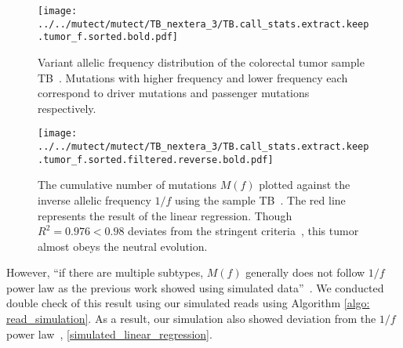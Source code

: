 \documentclass{article}
\begin{document}
\begin{figure}[H]
 \begin{minipage}[c]{0.47\hsize}
 \begin{center}
  \texttt{[image: ../../mutect/mutect/TB\_nextera\_3/TB.call\_stats.extract.keep.tumor\_f.sorted.bold.pdf]}
 \end{center}
    \caption{
  Variant allelic frequency distribution of the colorectal tumor sample TB~\cite{williams2016identification}.
  Mutations with higher frequency and lower frequency each correspond to driver mutations and passenger mutations respectively.
  }\label{TB_vaf}
\end{minipage}
 \hspace{1truecm}
\begin{minipage}[c]{0.47\hsize}
 \begin{center}
 \texttt{[image: ../../mutect/mutect/TB\_nextera\_3/TB.call\_stats.extract.keep.tumor\_f.sorted.filtered.reverse.bold.pdf]}
 \end{center}
   \caption{
  The cumulative number of mutations $M(f)$ plotted against the inverse allelic frequency $1/f$
  using the sample TB~\cite{williams2016identification}.
  The red line represents the result of the linear regression.
 Though $R^2 = 0.976 < 0.98$ deviates from the stringent criteria~\cite{williams2016identification}, this tumor almost obeys the neutral evolution.
  }
 \label{TB_linear_regression}
\end{minipage}
\end{figure}

However, ``if there are multiple subtypes, $M(f)$ generally does not follow $1/f$ power law as the previous work showed using simulated data''~\cite{williams2016identification}.
We conducted double check of this result using our simulated reads using Algorithm \ref{algo: read_simulation}. As a result, our simulation also showed deviation from the $1/f$ power law~, \ref{simulated_linear_regression}.
\end{document}
